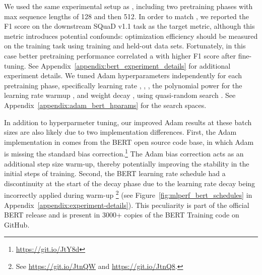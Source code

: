 \documentclass{article}
\begin{document}
We used the same experimental setup as \citet{you2019lamb}, including two pretraining phases with max sequence lengths of 128 and then 512.
In order to match \citet{you2019lamb}, we reported the F1 score on the downstream SQuaD v1.1 task as the target metric, although this metric introduces potential confounds: optimization efficiency should be measured on the training task using training and held-out data sets. Fortunately, in this case better pretraining performance correlated a with higher F1 score after fine-tuning. See Appendix~\ref{appendix:bert_experiment_details} for additional experiment details. We tuned Adam hyperparameters independently for each pretraining phase, specifically learning rate , , , the polynomial power for the learning rate warmup , and weight decay , using quasi-random search \citep{bousquet2017critical}. See Appendix~\ref{appendix:adam_bert_hparams} for the search spaces.


In addition to hyperparmeter tuning, our improved Adam results at these batch sizes are also likely due to two implementation differences. First, the Adam implementation in \citet{you2019lamb} comes from the BERT open source code base, in which Adam is missing the standard bias correction.\footnote{\url{https://git.io/JtY8d}} The Adam bias correction acts as an additional step size warm-up, thereby potentially improving the stability in the initial steps of training. Second, the BERT learning rate schedule had a discontinuity at the start of the decay phase due to the learning rate decay being incorrectly applied during warm-up \footnote{See \url{https://git.io/JtnQW} and \url{https://git.io/JtnQ8}.} (see Figure~\ref{fig:mlperf_bert_schedules} in Appendix~\ref{appendix:experiment-details}). This peculiarity is part of the official BERT release and is present in 3000+ copies of the BERT Training code on GitHub.
\end{document}
